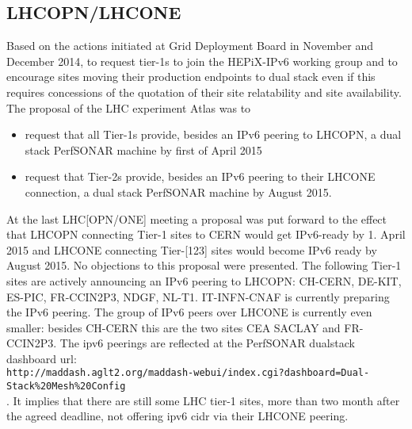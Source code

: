 \subsection{LHCOPN/LHCONE}
Based on the actions initiated at Grid Deployment Board in November and December 2014, to request tier-1s to join the HEPiX-IPv6 working group and to encourage sites moving their production endpoints to dual stack even if this requires concessions of the quotation of their site relatability and site availability. The proposal of the LHC experiment Atlas was to
\begin{itemize}
 \item request that all Tier-1s provide,
	besides an IPv6 peering to LHCOPN,
        a dual stack PerfSONAR machine by first of April 2015
 \item request that Tier-2s provide,
        besides an IPv6 peering to their LHCONE connection,
        a dual stack PerfSONAR machine by August 2015.
\end{itemize}
At the last LHC[OPN/ONE] meeting a proposal was put forward to the effect that
LHCOPN connecting Tier-1 sites to CERN would get IPv6-ready by 1. April 2015 and
LHCONE connecting Tier-[123] sites would become IPv6 ready by August 2015.
No objections to this proposal were presented. The following Tier-1 sites are actively announcing an IPv6 peering to LHCOPN: CH-CERN, DE-KIT, ES-PIC, FR-CCIN2P3, NDGF, NL-T1. IT-INFN-CNAF is currently preparing the IPv6 peering. The group of IPv6 peers over LHCONE is currently even smaller: besides CH-CERN this are the two sites CEA SACLAY and FR-CCIN2P3.
The ipv6 peerings are reflected at the PerfSONAR dualstack dashboard url:\\
{\tt\small http://maddash.aglt2.org/maddash-webui/index.cgi?dashboard=Dual-Stack\%20Mesh\%20Config}\\. It implies that there are still some LHC tier-1 sites, more than two month after the agreed deadline, not offering ipv6 cidr via their LHCONE peering.
